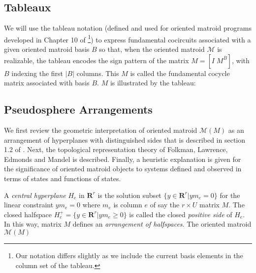 \documentclass{amsproc-sunycstr}
\def\Reals{\ensuremath{\mathbf R}}
\theoremstyle{plain}
\theoremstyle{definition}
\theoremstyle{remark}
\newcommand{\hmat}[2]{[#1\;#2]}
\begin{document}
\subsection{Tableaux}

We will use the tableau notation (defined and used for oriented matroid
programs developed in Chapter 10 of 
\cite{OMBOOK}\footnote{Our notation 
differs slightly as we include the current basis elements in the column
set of the tableau.})
to express fundamental cocircuits associated with
a given oriented matroid basis $B$ so that, when the oriented matroid
$\mathcal{M}$ is realizable, the tableau encodes the sign pattern of 
the matrix $M=\hmat{I}{M^{\overline{B}}}$, with $B$ indexing the first
$|B|$ columns.  This $M$ is called the 
fundamental cocycle matrix associated with basis $B$.  $M$ is illustrated 
by the tableau:\\
\begin{center}

\end{center}




\subsection{Pseudosphere Arrangements}

We first review the geometric interpretation of oriented matroid
$\mathcal{M}(M)$ as an arrangement of hyperplanes with distinguished
sides that is described in
section 1.2 of \cite{OMBOOK}.
Next, the topological representation theory of Folkman, Lawrence, Edmonds
and Mandel is described.  Finally, a heuristic explanation is given
for the significance of oriented matroid objects to systems defined and 
observed in terms of  states and functions of states.


A \textit{central hyperplane} $H_e$ in $\Reals^{r}$ is the 
solution subset $\{y\in\Reals^{r}|y m_e =0\}$ for the linear
constraint $y m_e = 0$ where $m_e$ is column $e$ of say 
the $r\times U$ matrix $M$.  The closed halfspace
$H^+_e=\{y\in\Reals^{r}|y m_e \geq 0\}$ is called the closed
\textit{positive side} of $H_e$.  
In this way, matrix $M$ 
defines
an \textit{arrangement of halfspaces}.
The oriented matroid 
$\mathcal{M}(M)$
\end{document}
